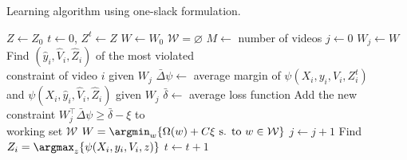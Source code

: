\begin{algorithm}
\normalsize
\caption{Learning algorithm using one-slack formulation.}
\label{alg:learning}
\begin{algorithmic}[1]
\State $Z \gets Z_0$
\State $t \gets 0$, 
\Repeat
\State $Z^t \gets Z$
\State $W \gets W_0$
\State $\mathcal{W} = \varnothing$
\State $M \gets$ number of videos
\State $j \gets 0$
\Repeat
\State $W_j \gets W$
\State Find $(\hat{y}_i,\hat{V}_i,\hat{Z}_i)$ of the most violated \\\hspace{0.9in} constraint of video $i$ given $W_j$ 
\EndFor
\State $\bar{\Delta}\psi \gets$ average margin of  $\psi(X_i,y_i,V_i,Z_i^t)$\\\hspace{0.7in} and $\psi(X_i,\hat{y}_i,\hat{V}_i,\hat{Z}_i)$ given $W_j$
\State $\bar{\delta} \gets$ average loss function 
\State Add the new constraint $W_j^{\top} \bar{\Delta}\psi \ge \bar{\delta} - \xi$ to \\\hspace{0.7in}working set $\mathcal{W}$
\State $W = \argmin_{w}\{ \Omega(w) + C\xi ~ \text{s. to}~ w \in \mathcal{W}\}$
\State $j \gets j+1$
\State Find $Z_i = \argmax_{z}\{\psi(X_i,y_i,V_i,z)\}$
\EndFor
\State $t \gets t+1$
\EndProcedure
\end{algorithmic}
\end{algorithm}
